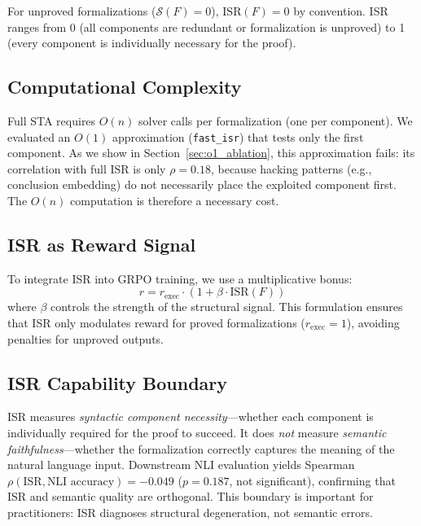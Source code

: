 \documentclass[11pt,twocolumn]{article}
\newcommand{\isr}{\textsc{ISR}}
\newcommand{\sta}{\textsc{STA}}
\newcommand{\grpo}{\textsc{GRPO}}
\begin{document}
For unproved formalizations ($\mathcal{S}(F) = 0$), $\text{ISR}(F) = 0$ by convention.
\isr{} ranges from 0 (all components are redundant or formalization is unproved) to 1 (every component is individually necessary for the proof).

\subsection{Computational Complexity}

Full \sta{} requires $O(n)$ solver calls per formalization (one per component).
We evaluated an $O(1)$ approximation (\texttt{fast\_isr}) that tests only the first component.
As we show in Section~\ref{sec:o1_ablation}, this approximation fails: its correlation with full \isr{} is only $\rho{=}0.18$, because hacking patterns (e.g., conclusion embedding) do not necessarily place the exploited component first.
The $O(n)$ computation is therefore a necessary cost.

\subsection{ISR as Reward Signal}

To integrate \isr{} into \grpo{} training, we use a multiplicative bonus:
\begin{equation}
    r = r_{\text{exec}} \cdot (1 + \beta \cdot \text{ISR}(F))
\label{eq:bonus}
\end{equation}
where $\beta$ controls the strength of the structural signal.
This formulation ensures that \isr{} only modulates reward for proved formalizations ($r_{\text{exec}}{=}1$), avoiding penalties for unproved outputs.

\subsection{ISR Capability Boundary}

\isr{} measures \emph{syntactic component necessity}---whether each component is individually required for the proof to succeed.
It does \emph{not} measure \emph{semantic faithfulness}---whether the formalization correctly captures the meaning of the natural language input.
Downstream NLI evaluation yields Spearman $\rho(\text{ISR}, \text{NLI accuracy}) = -0.049$ ($p{=}0.187$, not significant), confirming that \isr{} and semantic quality are orthogonal.
This boundary is important for practitioners: \isr{} diagnoses structural degeneration, not semantic errors.
\end{document}
